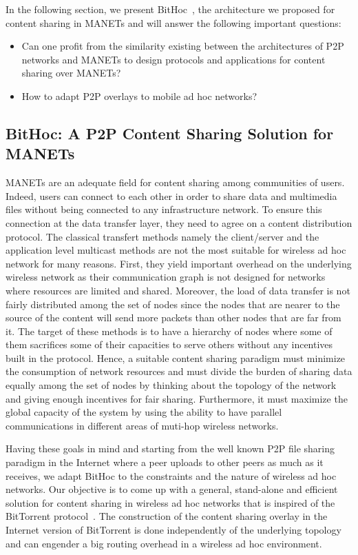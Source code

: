 In the following section, we present BitHoc~\cite{BitHoc, BitHocWeb}, the architecture we proposed for content sharing in MANETs and  will answer the following important questions:

\begin{itemize}
\item{Can one profit from the similarity existing between the architectures of P2P networks and MANETs to design protocols and applications for content sharing over MANETs?}
\item{How to adapt P2P overlays to mobile ad hoc networks?}
\end{itemize}

\subsection{BitHoc: A P2P Content Sharing Solution for MANETs}

MANETs are an adequate field for content sharing among communities of users. Indeed, users can connect to each other in order to share data and multimedia files without being connected to any infrastructure network. To ensure this connection at the data transfer layer, they need to agree on a content distribution protocol. The classical transfert methods namely the client/server and the application level multicast methods are not the most suitable for wireless ad hoc network for many reasons. First, they yield important overhead on the underlying wireless network as their communication graph is not designed for networks where resources are limited and shared. Moreover, the load of data transfer is not fairly distributed among the set of nodes since the nodes that are nearer to the source of the content will send more packets than other nodes that are far from it. The target of these methods is to have a hierarchy of nodes where some of them sacrifices some of their capacities to serve others without any incentives built in the protocol. 
Hence, a suitable content sharing paradigm must minimize the consumption of network resources and must divide the burden of sharing data equally among the set of nodes by thinking about the topology of the network and giving enough incentives for fair sharing. Furthermore, it must maximize the global capacity of the system by using the ability to have parallel communications in different areas of muti-hop wireless networks.

Having these goals in mind and starting from the well known P2P file sharing paradigm in the Internet where a peer uploads to other peers as much as it receives, we adapt BitHoc to the constraints and the nature of wireless ad hoc networks. Our objective is to come up with a general, stand-alone and efficient solution for content sharing in wireless ad hoc networks that is inspired of the BitTorrent protocol~\cite{RefBT}. The construction of the content sharing overlay in the Internet version of BitTorrent is done independently of the underlying topology and can engender a big routing overhead in a wireless ad hoc environment.

